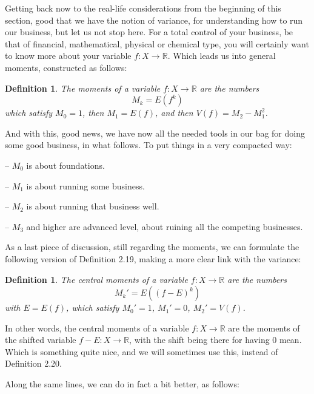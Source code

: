\documentclass[12pt]{amsbook}
\newtheorem{definition}[theorem]{Definition}
\begin{document}
Getting back now to the real-life considerations from the beginning of this section, good that we have the notion of variance, for understanding how to run our business, but let us not stop here. For a total control of your business, be that of financial, mathematical, physical or chemical type, you will certainly want to know more about your variable $f:X\to\mathbb R$. Which leads us into general moments, constructed as follows:


\begin{definition}
The moments of a variable $f:X\to\mathbb R$ are the numbers
$$M_k=E(f^k)$$
which satisfy $M_0=1$, then $M_1=E(f)$, and then $V(f)=M_2-M_1^2$.
\end{definition}

And with this, good news, we have now all the needed tools in our bag for doing some good business, in what follows. To put things in a very compacted way:

\medskip

-- $M_0$ is about foundations.

\medskip

-- $M_1$ is about running some business.

\medskip

-- $M_2$ is about running that business well.

\medskip

-- $M_3$ and higher are advanced level, about ruining all the competing businesses. 

\medskip

As a last piece of discussion, still regarding the moments, we can formulate the following version of Definition 2.19, making a more clear link with the variance:


\begin{definition}
The central moments of a variable $f:X\to\mathbb R$ are the numbers
$$M_k'=E((f-E)^k)$$
with $E=E(f)$, which satisfy $M_0'=1$, $M_1'=0$, $M_2'=V(f)$.
\end{definition}

In other words, the central moments of a variable $f:X\to\mathbb R$ are the moments of the shifted variable $f-E:X\to\mathbb R$, with the shift being there for having 0 mean. Which is something quite nice, and we will sometimes use this, instead of Definition 2.20.

\bigskip

Along the same lines, we can do in fact a bit better, as follows:
\end{document}
